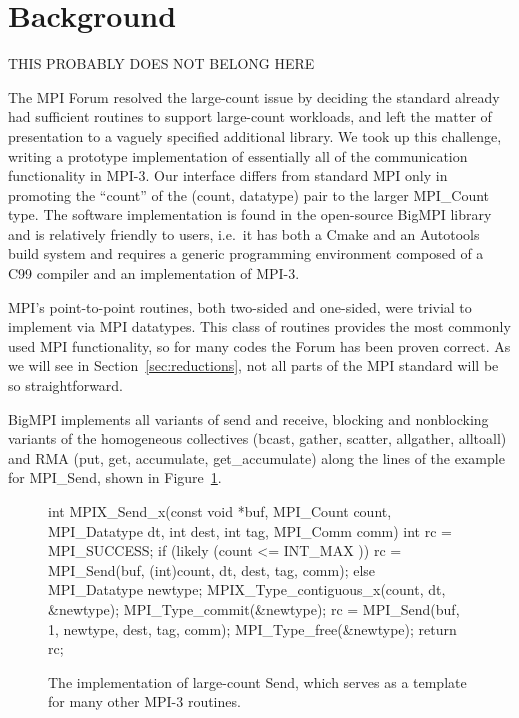 
\section{Background}

THIS PROBABLY DOES NOT BELONG HERE

The MPI Forum resolved the large-count issue by deciding the standard already
had sufficient routines to support large-count workloads, and left the matter
of presentation to a vaguely specified additional library.  We took up this
challenge, writing a prototype implementation of
essentially all of the communication functionality in MPI-3.  Our interface
differs from standard MPI only in promoting the ``count'' of the (count,
datatype) pair to the larger MPI\_Count type.  The software implementation is
found in the open-source BigMPI
library and is relatively friendly to users, i.e.\ it has both a Cmake
and an Autotools build system and requires a generic programming
environment composed of a C99 compiler and an implementation
of MPI-3.

MPI's point-to-point routines, both two-sided and one-sided, were
trivial to implement via MPI datatypes.  This class of routines provides the
most commonly used MPI functionality, so for many codes the Forum has been
proven correct.  As we will see in Section~\ref{sec:reductions},
not all parts of the MPI
standard will be so straightforward.

BigMPI implements all variants of send and receive, blocking and nonblocking variants of
the homogeneous collectives (bcast, gather, scatter, allgather, alltoall)
and RMA (put, get, accumulate, get\_accumulate)
along the lines of the example for MPI\_Send, shown in Figure~\ref{code:mpi_send_x}.

\begin{figure}
\begin{code}
int MPIX_Send_x(const void *buf, MPI_Count count,
                MPI_Datatype dt, int dest,
                int tag, MPI_Comm comm)
{
    int rc = MPI_SUCCESS;
    if (likely (count <= INT_MAX )) {
        rc = MPI_Send(buf, (int)count, dt, dest, tag, comm);
    } else {
        MPI_Datatype newtype;
        MPIX_Type_contiguous_x(count, dt, &newtype);
        MPI_Type_commit(&newtype);
        rc = MPI_Send(buf, 1, newtype, dest, tag, comm);
        MPI_Type_free(&newtype);
    }
    return rc;
}
\end{code}
\label{code:mpi_send_x}
\caption{The implementation of large-count Send, which serves as a template
for many other MPI-3 routines.}
\end{figure}

